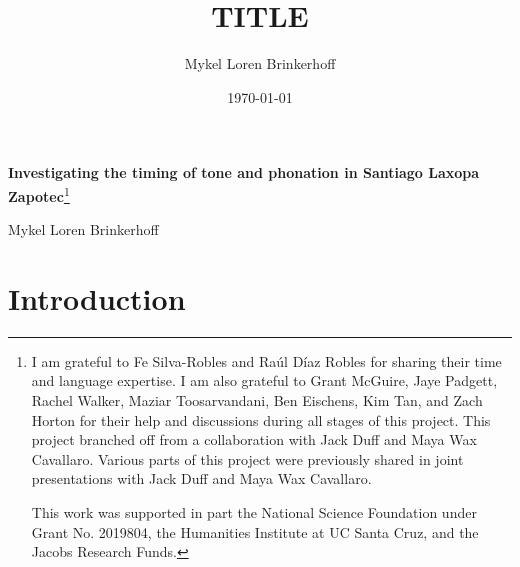 \documentclass[12pt, letterpaper]{article}
\title{TITLE}
\author{Mykel Loren Brinkerhoff}
\date{\today}
\begin{document}
	
	
	
\begin{center}
	{\Large \textbf{Investigating the timing of tone and phonation in Santiago Laxopa Zapotec}}\footnote{I am grateful to Fe Silva-Robles and  Raúl Díaz Robles for sharing their time and language expertise. I am also grateful to Grant McGuire,  Jaye Padgett, Rachel Walker, Maziar Toosarvandani, Ben Eischens, Kim Tan, and Zach Horton for their help and discussions during all stages of this project. This project branched off from a collaboration with  Jack Duff and Maya Wax Cavallaro. Various parts of this project were previously shared in joint presentations with Jack Duff and Maya Wax Cavallaro.
	
	This work was supported in part the National Science Foundation under Grant No. 2019804, the Humanities Institute at UC Santa Cruz, and the Jacobs Research Funds.}
	\vspace{6pt}

	Mykel Loren Brinkerhoff
\end{center}
\thispagestyle{fancy}



\section{Introduction} \label{sec:Introduction}
\end{document}
